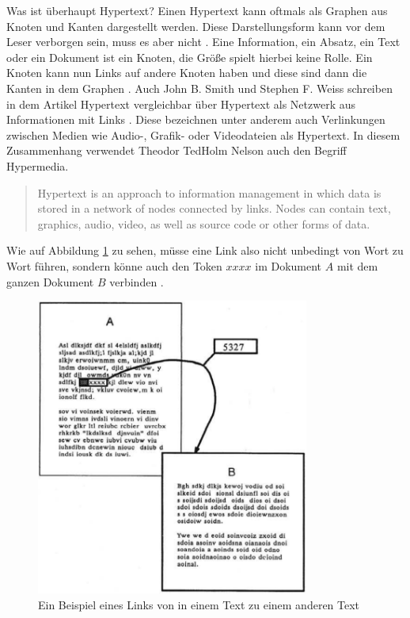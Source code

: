 \begin{section}{Was ist überhaupt Hypertext?}
Einen Hypertext kann oftmals als Graphen aus Knoten und Kanten dargestellt werden. Diese Darstellungsform kann vor dem Leser verborgen sein, muss es aber nicht \cite{Conklin1987}. Eine Information, ein Absatz, ein Text oder ein Dokument ist ein Knoten, die Größe spielt hierbei keine Rolle. Ein Knoten kann nun Links auf andere Knoten haben und diese sind dann die Kanten in dem Graphen \cite[S.19]{Conklin1987} \cite[S.2]{Nielsen1995}. Auch John B. Smith und Stephen F. Weiss schreiben in dem Artikel Hypertext vergleichbar über Hypertext als Netzwerk aus Informationen mit Links \cite{Smith1988}. Diese bezeichnen unter anderem auch Verlinkungen zwischen Medien wie Audio-, Grafik- oder Videodateien als Hypertext. In diesem Zusammenhang verwendet Theodor \glqq Ted\grqq{ }Holm Nelson auch den Begriff \glqq Hypermedia\grqq{ }\cite{Nelson1965}.

\begin{quote}
    \glqq [...] Hypertext is an approach to information management in which data is stored in a network of nodes connected by links. Nodes can contain text, graphics, audio, video, as well as source code or other forms of data.\grqq{ }\cite{Smith1988}
\end{quote}

Wie auf Abbildung \ref{fig:imText} zu sehen, müsse eine Link also nicht unbedingt von Wort zu Wort führen, sondern könne auch den Token $xxxx$ im Dokument $A$ mit dem ganzen Dokument $B$ verbinden \cite{Conklin1987}. 

\begin{figure}[H]
	\centering
	\includegraphics[width=0.8\textwidth]{image/imText}
	\caption{Ein Beispiel eines Links von in einem Text zu einem anderen Text \cite[S.34]{Conklin1987}}
	\label{fig:imText}
\end{figure}


\end{section}
